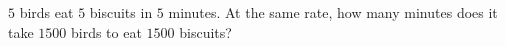 $5$ birds eat $5$ biscuits in $5$ minutes. At the same rate, how many minutes does it take $1500$ birds to eat $1500$ biscuits?
